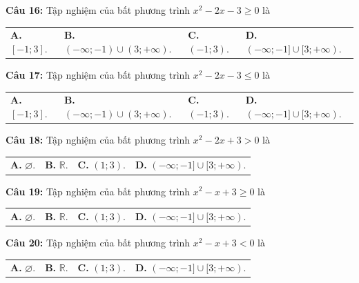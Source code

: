 \documentclass[12pt,a4paper]{extarticle}
\begin{document}
\noindent\textbf{Câu 16:} Tập nghiệm của bất phương trình $x^2-2x-3\ge 0$ là
\begin{center}
\begin{tabular}{p{3.5cm} p{3.5cm} p{3.5cm} p{3.5cm}}
\textbf{A.} $[-1;3]$. & \textbf{B.} $(-\infty;-1) \cup (3;+\infty)$. & \textbf{C.} $(-1;3)$. & \textbf{D.} $(-\infty;-1] \cup [3;+\infty)$.
\end{tabular}
\end{center}
\noindent\textbf{Câu 17:} Tập nghiệm của bất phương trình $x^2-2x-3\le 0$ là
\begin{center}
\begin{tabular}{p{3.5cm} p{3.5cm} p{3.5cm} p{3.5cm}}
\textbf{A.} $[-1;3]$. & \textbf{B.} $(-\infty;-1) \cup (3;+\infty)$. & \textbf{C.} $(-1;3)$. & \textbf{D.} $(-\infty;-1] \cup [3;+\infty)$.
\end{tabular}
\end{center}
\noindent\textbf{Câu 18:} Tập nghiệm của bất phương trình $x^2-2x+3>0$ là
\begin{center}
\begin{tabular}{p{3.5cm} p{3.5cm} p{3.5cm} p{3.5cm}}
\textbf{A.} $\varnothing$. & \textbf{B.} $\mathbb{R}$. & \textbf{C.} $(1;3)$. & \textbf{D.} $(-\infty;-1] \cup [3;+\infty)$.
\end{tabular}
\end{center}
\noindent\textbf{Câu 19:} Tập nghiệm của bất phương trình $x^2-x+3\ge 0$ là
\begin{center}
\begin{tabular}{p{3.5cm} p{3.5cm} p{3.5cm} p{3.5cm}}
\textbf{A.} $\varnothing$. & \textbf{B.} $\mathbb{R}$. & \textbf{C.} $(1;3)$. & \textbf{D.} $(-\infty;-1] \cup [3;+\infty)$.
\end{tabular}
\end{center}
\noindent\textbf{Câu 20:} Tập nghiệm của bất phương trình $x^2-x+3<0$ là
\begin{center}
\begin{tabular}{p{3.5cm} p{3.5cm} p{3.5cm} p{3.5cm}}
\textbf{A.} $\varnothing$. & \textbf{B.} $\mathbb{R}$. & \textbf{C.} $(1;3)$. & \textbf{D.} $(-\infty;-1] \cup [3;+\infty)$.
\end{tabular}
\end{center}
\end{document}
